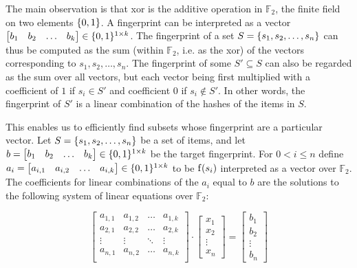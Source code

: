 The main observation is that xor is the additive operation in $\mathds{F}_2$, the finite field on two elements $\{0, 1\}$. A fingerprint can be interpreted as a vector $\begin{bmatrix}b_1 & b_2 & \ldots & b_k\end{bmatrix} \in \{0, 1\}^{1 \times k}$. The fingerprint of a set $S = \{s_1, s_2, \ldots, s_n\}$ can thus be computed as the sum (within $\mathds{F}_2$, i.e. as the xor) of the vectors corresponding to $s_1, s_2, \ldots, s_n$. The fingerprint of some $S' \subseteq S$ can also be regarded as the sum over all vectors, but each vector being first multiplied with a coefficient of $1$ if $s_i \in S'$ and coefficient $0$ if $s_i \notin S'$. In other words, the fingerprint of $S'$ is a linear combination of the hashes of the items in $S$. 

This enables us to efficiently find subsets whose fingerprint are a particular vector. Let $S = \{s_1, s_2, \ldots, s_n\}$ be a set of items, and let $b = \begin{bmatrix}b_1 & b_2 & \ldots & b_k\end{bmatrix} \in \{0, 1\}^{1 \times k}$ be the target fingerprint. For $0 < i \leq n$ define $a_i = \begin{bmatrix}a_{i, 1} & a_{i, 2} & \ldots & a_{i, k}\end{bmatrix} \in \{0, 1\}^{1 \times k}$ to be $\operatorname{f}(s_i)$ interpreted as a vector over $\mathds{F}_2$. The coefficients for linear combinations of the $a_i$ equal to $b$ are the solutions to the following system of linear equations over $\mathds{F}_2$:

\[
\begin{bmatrix}
a_{1, 1} & a_{1, 2} & \ldots & a_{1, k}\\
a_{2, 1} & a_{2, 2} & \ldots & a_{2, k}\\
\vdots & \vdots & \ddots & \vdots \\
a_{n, 1} & a_{n, 2} & \ldots & a_{n, k}\\
\end{bmatrix} \cdot \begin{bmatrix}
x_1\\
x_2\\
\vdots\\
x_n
\end{bmatrix} = \begin{bmatrix}
b_1\\
b_2\\
\vdots\\
b_n
\end{bmatrix}
\]

